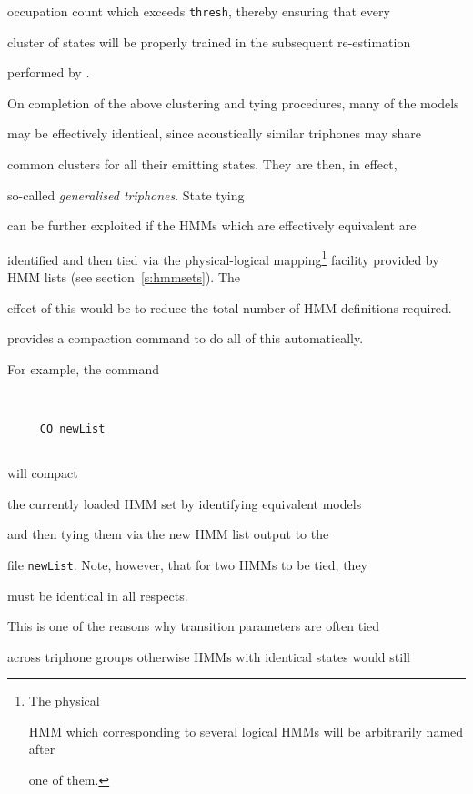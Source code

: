 occupation count which exceeds \texttt{thresh}, thereby ensuring that every


cluster of states will be properly trained in the subsequent re-estimation


performed by .








On completion of the above clustering and tying procedures, many of the models


may be effectively identical, since acoustically similar triphones may share


common clusters for all their emitting states.  They are then, in effect,


so-called {\it generalised triphones}. State tying


can be further exploited if the HMMs which are effectively equivalent are


identified and then tied via the physical-logical mapping\footnote{The physical


HMM which corresponding to several logical HMMs will be arbitrarily named after


one of them.} facility provided by HMM lists (see section~\ref{s:hmmsets}). The


effect of this would be to reduce the total number of HMM definitions required.


 provides a compaction command to do all of this automatically.


For example, the command


\begin{verbatim}


     CO newList 


\end{verbatim}


will compact 


the currently loaded HMM set by identifying equivalent models


and then tying them via the new HMM list output  to the 


file \texttt{newList}.  Note, however, that for two HMMs to be tied, they


must be identical in all respects.


This is one of the reasons why transition parameters are often tied


across triphone groups otherwise HMMs with identical states would still


